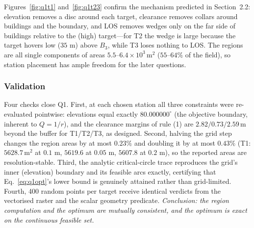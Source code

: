 Figures~\ref{fig:q1t1} and~\ref{fig:q1t23} confirm the mechanism predicted in Section~2.2: elevation removes
a disc around each target, clearance removes collars around buildings and the boundary,
and LOS removes wedges only on the far side of buildings relative to the (high)
target---for T2 the wedge is large because the target hovers low ($35$ m) above $B_3$,
while T3 loses nothing to LOS. The regions are all single components of areas
$5.5$--$6.4\times10^3\,\mathrm{m}^2$ ($55$--$64\%$ of the field), so station placement
has ample freedom for the later questions.

\subsubsection{Validation}

Four checks close Q1. First, at each chosen station all three constraints were
re-evaluated pointwise: elevations equal exactly $80.000000^\circ$ (the objective
boundary, inherent to $Q=1/r$), and the clearance margins of rule (1) are
$2.82/0.73/2.59\,\mathrm{m}$ beyond the buffer for T1/T2/T3, as designed. Second,
halving the grid step changes the region areas by at most $0.23\%$ and doubling it by
at most $0.43\%$ (T1: $5628.7\,\mathrm{m}^2$ at $0.1$ m, $5619.6$ at $0.05$ m,
$5607.8$ at $0.2$ m), so the reported areas are resolution-stable. Third, the analytic
critical-circle trace reproduces the grid's inner (elevation) boundary and its feasible
arcs exactly, certifying that Eq.~\eqref{eq:q1opt}'s lower bound is genuinely attained
rather than grid-limited. Fourth, 400 random points per target receive identical
verdicts from the vectorised raster and the scalar geometry predicate.
\emph{Conclusion: the region computation and the optimum are mutually consistent, and
the optimum is exact on the continuous feasible set.}
